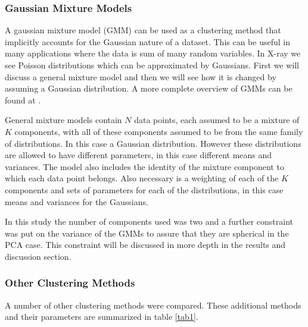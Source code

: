 \documentclass[a4paper,11pt]{article}
\begin{document}
\subsubsection{Gaussian Mixture Models}

A gaussian mixture model (GMM) can be used as a clustering method that implicitly accounts for the Gaussian nature of a dataset. This can be useful in many applications where the data is sum of many random variables. In X-ray we see Poisson distributions which can be approximated by Gaussians. First we will discuss a general mixture model and then we will see how it is changed by assuming a Gaussian distribution. A more complete overview of GMMs can be found at \cite{Ivo}.

General mixture models contain $N$ data points, each assumed to be a mixture of $K$ components, with all of these components assumed to be from the same family of distributions. In this case a Gaussian distribution. However these distributions are allowed to have different parameters, in this case different means and variances. The model also includes the identity of the mixture component to which each data point belongs. Also necessary is a weighting of each of the $K$ components and sets of parameters for each of the distributions, in this case means and variances for the Gaussians.

In this study the number of components used was two and a further constraint was put on the variance of the GMMs to assure that they are spherical in the PCA case. This constraint will be discussed in more depth in the results and discussion section.

\subsubsection{Other Clustering Methods}

A number of other clustering methods were compared. These additional methods and their parameters are summarized in table \ref{tab1}.
\end{document}

